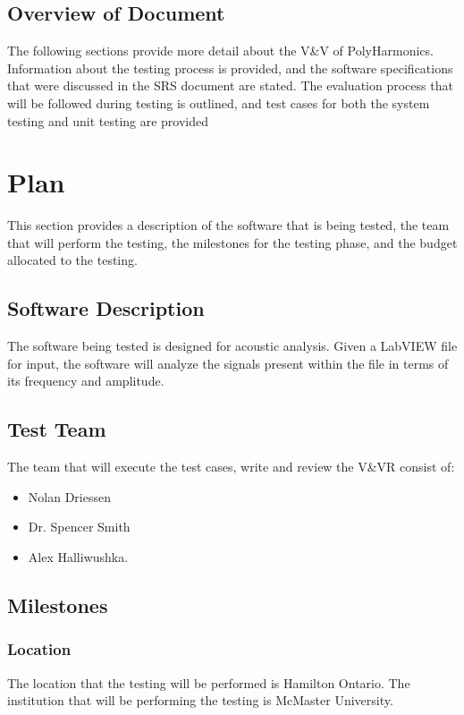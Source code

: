 \documentclass[12pt]{article}
\newcommand{\progname}{PolyHarmonics}
\begin{document}
\subsection{Overview of Document }
The following sections provide more detail about the V\&V of \progname{}. Information about the testing process is provided, and the software specifications
that were discussed in the SRS document are stated.  The evaluation process that will be followed during 
testing is outlined, and test cases for both the system testing and unit testing are provided 

%
%

\section{Plan}
This section provides a description of the software that is being tested, the team that will
perform the testing, the milestones for the testing phase, and the budget allocated to the testing. 

\subsection{Software Description}
The software being tested is designed for acoustic analysis. Given a LabVIEW file for input, the software will analyze the signals present within the file in terms of its frequency and amplitude.

\subsection{Test Team} 
The team that will execute the test cases, write and review the V\&VR consist of:

\begin{itemize}
 \item Nolan Driessen
 \item Dr. Spencer Smith
 \item Alex Halliwushka. 
\end{itemize}  

\subsection{Milestones}

\subsubsection{Location}
The location that the testing will be performed is Hamilton Ontario. The institution that
will be performing the testing is McMaster University. 
\end{document}
